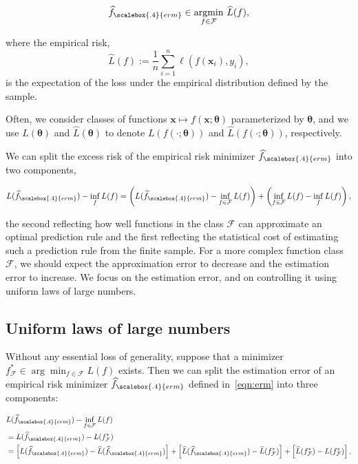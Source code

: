 \begin{equation}\label{eqn:erm}
    \widehat{f}_{\scalebox{.4}{erm}}
    \in\underset{f\in {\mathcal F}}{\mathrm{argmin}} \  \widehat L(f),
  \end{equation}

where the empirical risk, 
$$\widehat L(f) :=
\frac{1}{n}\sum_{i=1}^n \ell(f({\boldsymbol x}_i),y_i),$$ is the expectation of the loss under the empirical distribution defined by the sample.

Often, we consider classes of functions ${\boldsymbol x}\mapsto f({\boldsymbol x};{\boldsymbol \theta})$
parameterized by ${\boldsymbol \theta}$, and we use $L({\boldsymbol \theta})$ and $\widehat L({\boldsymbol \theta})$
to denote $L(f(\cdot;{\boldsymbol \theta}))$ and $\widehat L(f(\cdot;{\boldsymbol \theta}))$,
respectively.

We can split the excess risk of the empirical risk minimizer
$\widehat{f}_{\scalebox{.4}{erm}}$ into two components,

\begin{align}
	  \label{eq:est_approx_decomp}
    L(\widehat{f}_{\scalebox{.4}{erm}}) - \inf_{f}L(f)
      = \left(L(\widehat{f}_{\scalebox{.4}{erm}}) - \inf_{f\in {\mathcal F}}L(f)\right) +
      \left(\inf_{f\in {\mathcal F}}L(f) - \inf_{f}L(f)\right),
  \end{align}

the second reflecting how well functions in the class ${\mathcal F}$ can approximate an optimal prediction rule and the first reflecting the statistical cost of estimating such a prediction rule from the finite sample.  For a more complex function class ${\mathcal F}$, we should expect the approximation error to decrease and the estimation error to increase. We focus on the estimation error, and on controlling it using uniform laws of large numbers.

\subsection{Uniform laws of large numbers}

Without any essential loss of generality, suppose that a minimizer $f_{{\mathcal F}}^*\in\arg\min_{f\in {\mathcal F}} L(f)$ exists. Then we can split the estimation error of an empirical risk minimizer
$\widehat{f}_{\scalebox{.4}{erm}}$ defined in~\eqref{eqn:erm} into three components:

\begin{align}
    \lefteqn{L(\widehat{f}_{\scalebox{.4}{erm}}) - \inf_{f\in {\mathcal F}}L(f)} & \notag\\
      & = L(\widehat{f}_{\scalebox{.4}{erm}})-L(f_{{\mathcal F}}^*) \notag \\
      &= \left[ L(\widehat{f}_{\scalebox{.4}{erm}}) - \widehat L(\widehat{f}_{\scalebox{.4}{erm}}) \right]
        + \left[ \widehat L(\widehat{f}_{\scalebox{.4}{erm}}) - \widehat L(f_{{\mathcal F}}^*) \right]
        + \left[ \widehat L(f_{{\mathcal F}}^*) - L(f_{{\mathcal F}}^*) \right].
        \label{eqn:decomp} 
  \end{align}

